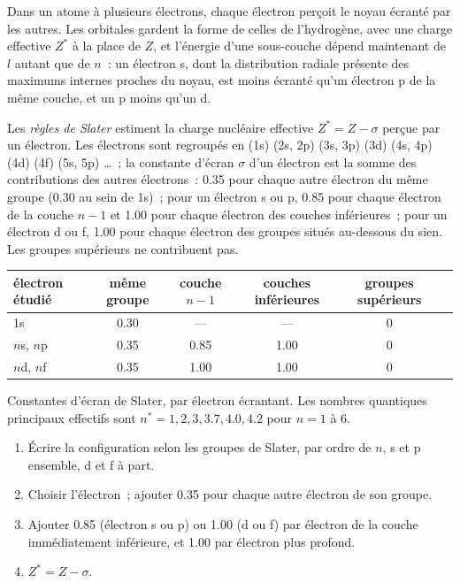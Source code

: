 Dans un atome à plusieurs électrons, chaque électron perçoit le noyau écranté par
les autres. Les orbitales gardent la forme de celles de l'hydrogène, avec une charge
effective $Z^*$ à la place de $Z$, et l'énergie d'une sous-couche dépend maintenant de $l$
autant que de $n$~: un électron s, dont la distribution radiale présente des maximums internes proches
du noyau, est moins écranté qu'un électron p de la même couche, et un p moins
qu'un d.

\begin{definition}\label{def:b2:atomic-orbitals:slater}
Les \emph{règles de Slater} estiment la charge nucléaire effective
$Z^* = Z - \sigma$ perçue par un électron. Les électrons sont regroupés en
(1s) (2s, 2p) (3s, 3p) (3d) (4s, 4p) (4d) (4f) (5s, 5p) \dots~; la constante
d'écran $\sigma$ d'un électron est la somme des contributions des autres
électrons~: 0.35 pour chaque autre électron du même groupe (0.30 au sein de 1s)~;
pour un électron s ou p, 0.85 pour chaque électron de la couche $n - 1$ et 1.00 pour
chaque électron des couches inférieures~; pour un électron d ou f, 1.00 pour chaque électron
des groupes situés au-dessous du sien. Les groupes supérieurs ne contribuent pas.
\end{definition}

\begin{omfigure}
\small
\renewcommand{\arraystretch}{1.2}
\begin{tabular}{l|ccccc}
électron étudié & même groupe & couche $n - 1$ & couches inférieures & groupes supérieurs \\ \hline
1s & 0.30 & --- & --- & 0 \\
$n$s, $n$p & 0.35 & 0.85 & 1.00 & 0 \\
$n$d, $n$f & 0.35 & 1.00 & 1.00 & 0 \\
\end{tabular}

\smallskip
{\small Constantes d'écran de Slater, par électron écrantant. Les nombres quantiques
principaux effectifs sont $n^* = 1, 2, 3, 3.7, 4.0, 4.2$ pour $n = 1$ à 6.}
\end{omfigure}

\begin{method}\label{met:b2:atomic-orbitals:slater}
\begin{enumerate}
  \item Écrire la configuration selon les groupes de Slater, par ordre de $n$, s et p
        ensemble, d et f à part.
  \item Choisir l'électron~; ajouter 0.35 pour chaque autre électron de son groupe.
  \item Ajouter 0.85 (électron s ou p) ou 1.00 (d ou f) par électron de la couche
        immédiatement inférieure, et 1.00 par électron plus profond.
  \item $Z^* = Z - \sigma$.
\end{enumerate}
\end{method}

